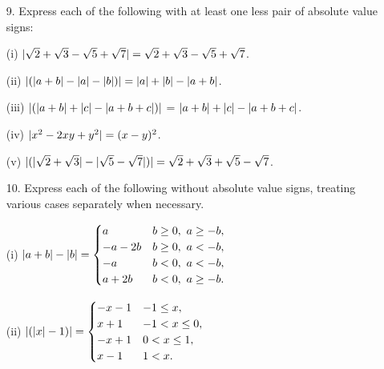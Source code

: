 \documentclass[11pt]{article}
\begin{document}
\begin{enumerate}
          \pagebreak

    \item[9.] Express each of the following with at least one less pair of absolute value
          signs:

    \item[(i)] $\lvert\sqrt{2} + \sqrt{3} - \sqrt{5} + \sqrt{7}\rvert = \sqrt{2} + \sqrt{3} - \sqrt{5} + \sqrt{7}$.

    \item[(ii)] $\lvert(\lvert a + b\rvert - \lvert a\rvert - \lvert b\rvert)\rvert = \lvert a\rvert + \lvert b\rvert - \lvert a + b\rvert$.

    \item[(iii)] $\lvert(\lvert a + b\rvert + \lvert c\rvert - \lvert a + b + c\rvert)\rvert$ = $\lvert a + b\rvert + \lvert c\rvert - \lvert a + b + c\rvert$.

    \item[(iv)] $\lvert x^2 - 2xy + y^2\rvert = (x-y)^2$.

    \item[(v)] $\lvert(\lvert\sqrt{2} + \sqrt{3}\rvert - \lvert\sqrt{5} - \sqrt{7}\rvert)\rvert = \sqrt{2} + \sqrt{3} + \sqrt{5} - \sqrt{7}$.

          \vspace{1em}

    \item[10.] Express each of the following without absolute value signs, treating various cases
          separately when necessary.

    \item[(i)] $
              \lvert a + b\rvert - \lvert b\rvert =
              \begin{cases}
                  a       & b \geq 0,\ a \geq -b, \\
                  -a - 2b & b \geq 0,\ a < -b,    \\
                  -a      & b < 0,\ a < -b,       \\
                  a + 2 b & b < 0,\ a \geq -b.    \\
              \end{cases}
          $

    \item[(ii)] $
              \lvert(\lvert x\rvert - 1)\rvert =
              \begin{cases}
                  -x - 1 & -1 \leq x,     \\
                  x + 1  & -1 < x \leq 0, \\
                  -x + 1 & 0 < x \leq 1,  \\
                  x - 1  & 1 < x.
              \end{cases}
          $


\end{enumerate}
\end{document}
